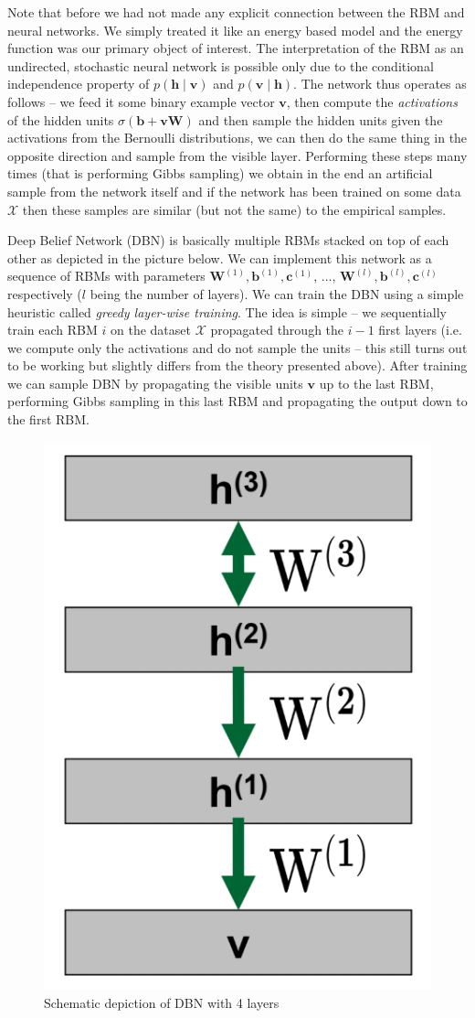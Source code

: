 \documentclass[a5paper]{article}
\newcommand{\mc}[1]{\mathcal{#1}}
\begin{document}
Note that before we had not made any explicit connection between the RBM and neural networks. We
simply treated it like an energy based model and the energy function was our primary object of
interest. The interpretation of the RBM as an undirected, stochastic neural network is possible only
due to the conditional independence property of $p(\bm{h} \mid \bm{v})$ and $p(\bm{v} \mid \bm{h})$.
The network thus operates as follows -- we feed it some binary example vector $\bm{v}$, then compute
the \emph{activations} of the hidden units $\sigma(\bm{b} + \bm{v}\bm{W})$ and then sample the
hidden units given the activations from the Bernoulli distributions, we can then do the same thing
in the opposite direction and sample from the visible layer. Performing these steps many times (that
is performing Gibbs sampling) we obtain in the end an artificial sample from the network itself and
if the network has been trained on some data $\mc{X}$ then these samples are similar (but not the
same) to the empirical samples.

Deep Belief Network (DBN) is basically multiple RBMs stacked on top of each other as depicted in the
picture below. We can implement this network as a sequence of RBMs with parameters $\bm{W}^{(1)},
\bm{b}^{(1)}, \bm{c}^{(1)}$, $\ldots$, $\bm{W}^{(l)}, \bm{b}^{(l)}, \bm{c}^{(l)}$ respectively ($l$
being the number of layers). We can train the DBN using a simple heuristic called \emph{greedy
layer-wise training}. The idea is simple -- we sequentially train each RBM $i$ on the dataset
$\mc{X}$ propagated through the $i-1$ first layers (i.e. we compute only the activations and do not
sample the units -- this still turns out to be working but slightly differs from the theory
presented above). After training we can sample DBN by propagating the visible units $\bm{v}$ up to
the last RBM, performing Gibbs sampling in this last RBM and propagating the output down to the
first RBM.

\begin{figure}[ht]
   \centering
   \includegraphics[width=0.35\columnwidth]{figs/dbn.png}
   \caption{Schematic depiction of DBN with 4 layers \cite{Kurdziel}}
   \label{fig:dbn}
\end{figure}
\end{document}
